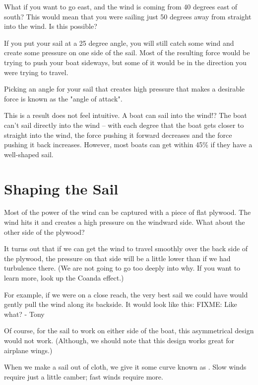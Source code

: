 What if you want to go east,  and the wind is coming from 40 degrees east of south?  This would mean that you were sailing just 50 degrees away from 
straight into the wind. Is this possible?

If you put your sail at a 25 degree angle, you will still catch some wind and create some pressure on one side of the sail.  Most of the resulting force would be trying to push
your boat sideways,  but some of it would be in the direction you were trying to travel. 

Picking an angle for your sail that creates high pressure that makes a desirable force is known as the "angle of attack".

This is a result does not feel intuitive. A boat can sail into the wind!? The boat can't sail directly into the wind -- with each degree that the boat gets closer
to straight into the wind,  the force pushing it forward decreases and the force pushing it back increases. However,  most boats can get within 45\% if they have a well-shaped sail.

\section{Shaping the Sail}

Most of the power of the wind can be captured with a piece of flat plywood.  The wind hits it and creates a high pressure on the windward side. What about the other side of the plywood?

It turns out that if we can get the wind to travel smoothly over the back side of the plywood,   the pressure on that side will be a little lower than if we had turbulence there.   (We are not going
to go too deeply into why. If you want to learn more, look up the Coanda effect.)

For example, if we were on a close reach, the very best sail we could have would gently pull the wind along its backside.  It would look like this:
FIXME: Like what? - Tony

Of course, for the sail to work on either side of the boat,  this asymmetrical design would not work.  (Although,  we should note that this design works great
for airplane wings.)

When we make a sail out of cloth,  we give it some curve known as .  Slow winds require just a little camber;  fast winds require more.

